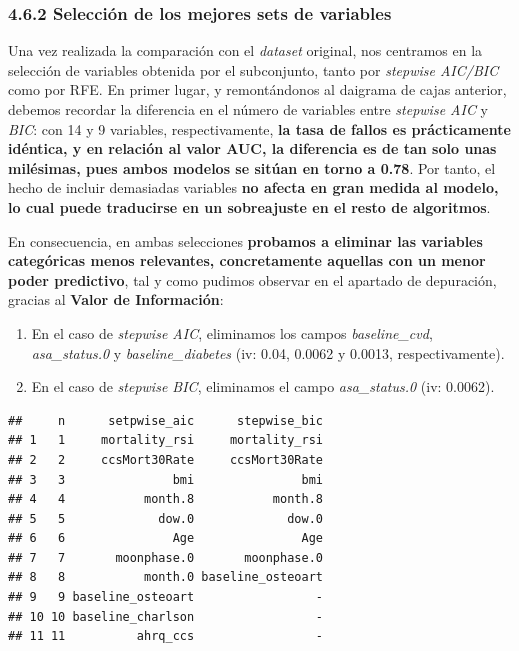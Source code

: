 \documentclass[
]{article}
\begin{document}
\hypertarget{selecciuxf3n-de-los-mejores-sets-de-variables}{%
\subsubsection{4.6.2 Selección de los mejores sets de
variables}\label{selecciuxf3n-de-los-mejores-sets-de-variables}}

Una vez realizada la comparación con el \emph{dataset} original, nos
centramos en la selección de variables obtenida por el subconjunto,
tanto por \emph{stepwise AIC/BIC} como por RFE. En primer lugar, y
remontándonos al daigrama de cajas anterior, debemos recordar la
diferencia en el número de variables entre \emph{stepwise AIC} y
\emph{BIC}: con 14 y 9 variables, respectivamente, \textbf{la tasa de
fallos es prácticamente idéntica, y en relación al valor AUC, la
diferencia es de tan solo unas milésimas, pues ambos modelos se sitúan
en torno a 0.78}. Por tanto, el hecho de incluir demasiadas variables
\textbf{no afecta en gran medida al modelo, lo cual puede traducirse en
un sobreajuste en el resto de algoritmos}.

En consecuencia, en ambas selecciones \textbf{probamos a eliminar las
variables categóricas menos relevantes, concretamente aquellas con un
menor poder predictivo}, tal y como pudimos observar en el apartado de
depuración, gracias al \textbf{Valor de Información}:

\begin{enumerate}
\def\labelenumi{\arabic{enumi}.}
\item
  En el caso de \emph{stepwise AIC}, eliminamos los campos
  \emph{baseline\_cvd}, \emph{asa\_status.0} y \emph{baseline\_diabetes}
  (iv: 0.04, 0.0062 y 0.0013, respectivamente).
\item
  En el caso de \emph{stepwise BIC}, eliminamos el campo
  \emph{asa\_status.0} (iv: 0.0062).
\end{enumerate}

\begin{verbatim}
##     n      setpwise_aic      stepwise_bic
## 1   1     mortality_rsi     mortality_rsi
## 2   2     ccsMort30Rate     ccsMort30Rate
## 3   3               bmi               bmi
## 4   4           month.8           month.8
## 5   5             dow.0             dow.0
## 6   6               Age               Age
## 7   7       moonphase.0       moonphase.0
## 8   8           month.0 baseline_osteoart
## 9   9 baseline_osteoart                 -
## 10 10 baseline_charlson                 -
## 11 11          ahrq_ccs                 -
\end{verbatim}
\end{document}
